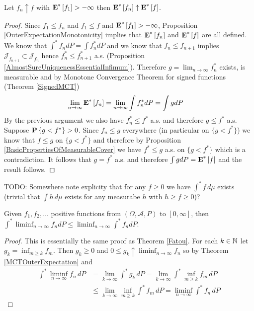 \begin{thm}\label{MCTOuterExpectation}Let $f_n \uparrow f$ with $\textbf{E}^*\left[f_1\right] > - \infty$ then
$\textbf{E}^*\left[f_n\right] \uparrow \textbf{E}^*\left[f\right]$.
\end{thm}
\begin{proof}
Since $f_1 \leq f_n$ and $f_1 \leq f$ and $\textbf{E}^*\left[f_1\right] > - \infty$, Proposition \ref{OuterExpectationMonotonicity} implies that $\textbf{E}^*\left[f_n\right]$ and $\textbf{E}^*\left[f\right]$ are all defined. 
We know that $\int^* f_n dP = \int f_n^* dP$ and we know that $f_n \leq f_{n+1}$ implies $\mathcal{J}_{f_{n+1}} \subset \mathcal{J}_{f_n}$ hence $f_n^* \leq f_{n+1}^*$ a.s.  (Proposition \ref{AlmostSureUniquenessEssentialInfimum}).  Therefore $g=\lim_{n \to \infty} f^*_n$ exists, is measurable and by Monotone Convergence Theorem for signed functions (Theorem \ref{SignedMCT})
\begin{align*}
\lim_{n \to \infty} \textbf{E}^*\left[f_n\right] &= \lim_{n \to \infty} \int f_n^* dP = \int g dP
\end{align*}  
By the previous argument 
we also have $f^*_n \leq f^*$ a.s. and therefore $g \leq f^*$ a.s.  Suppose $\textbf{P}\left \{g < f^* \right \} > 0$.  Since $f_n \leq g$ everywhere (in particular on $\lbrace g < f^* \rbrace$) we know that $f \leq g$ on $\lbrace g < f^* \rbrace$ and therefore by Proposition \ref{BasicPropertiesOfMeasurableCover} we have $f^* \leq g$ a.s. on $\lbrace g < f^* \rbrace$ which is a contradiction.  It follows that $g = f^*$ a.s. and therefore $\int g dP = \textbf{E}^*\left[f\right]$ and the result follows.
\end{proof}

TODO: Somewhere note explicity that for any $f \geq 0$ we have $\int^* f \, d\mu$ exists (trivial that $\int h \, d\mu$ exists for any measurabe $h$ with $h\geq f \geq 0$)?
\begin{thm}\label{FatouOuterExpectation}Given $f_1, f_2, \dots$
  positive functions from
  $(\Omega, \mathcal{A}, P)$ to $[0,\infty]$,
  then $\int^* \liminf_{n \to \infty} f_n d P \leq \liminf_{n \to
    \infty} \int^* f_n d P$.
\end{thm}
\begin{proof}
This is essentially the same proof as Theorem \ref{Fatou}.  For each $k \in \mathbb{N}$ let $g_k = \inf_{m \geq k} f_m$.  Then $g_k \geq 0$ and $0 \leq g_k \uparrow \liminf_{n \to \infty} f_n$ so by Theorem \ref{MCTOuterExpectation} and 
\begin{align*}
\int^* \liminf_{n \to \infty} f_n \, dP &= \lim_{k \to \infty} \int^* g_k \, dP = \lim_{k \to \infty} \int^* \inf_{m \geq k} f_m \, dP \\
&\leq \lim_{k \to \infty} \inf_{m \geq k}\int^* f_m \, dP  = \liminf_{n \to \infty} \int^* f_n \, dP
\end{align*}
\end{proof}

